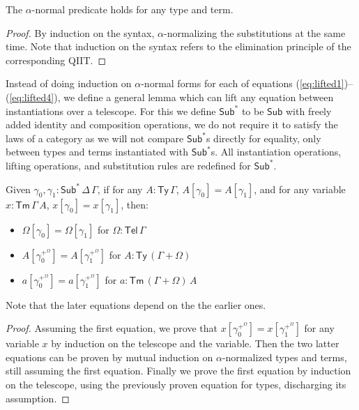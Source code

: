 \documentclass[a4paper,UKenglish,cleveref, autoref, thm-restate]{lipics-v2021}
\newcommand{\Ty}{\mathsf{Ty}}
\newcommand{\Tm}{\mathsf{Tm}}
\newcommand{\Sub}{\mathsf{Sub}}
\newcommand{\Tel}{\mathsf{Tel}}
\begin{document}
\begin{lemma}
  \label{thm:alpha}
  The $\alpha$-normal predicate holds for any type and term.
\end{lemma}
\begin{proof}
  By induction on the syntax, $\alpha$-normalizing the substitutions
  at the same time. Note that induction on the syntax refers to the
  elimination principle of the corresponding QIIT.
\end{proof}

Instead of doing induction on $\alpha$-normal forms for each of equations 
(\ref{eq:lifted1})--(\ref{eq:lifted4}), we define a general lemma which can lift any equation between
instantiations over a telescope. For this we define $\Sub^*$ to be $\Sub$ with
freely added identity and composition operations, we do not require it to
satisfy the laws of a category as we will not compare $\Sub^*$s directly for
equality, only between types and terms instantiated with $\Sub^*$s. All
instantiation operations, lifting operations, and substitution rules are
redefined for $\Sub^*$.
\begin{lemma}
  \label{thm:lifting}
  Given $\gamma_0, \gamma_1 : \Sub^*\,\Delta\,\Gamma$, if for any $A:\Ty\,\Gamma$, $A[\gamma_0] = A[\gamma_1]$, and
  for any variable $x:\Tm\,\Gamma\,A$, $x[\gamma_0] = x[\gamma_1]$,
  then:
  \begin{itemize}
    \item $\Omega[\gamma_0] = \Omega[\gamma_1]$ for $\Omega:\Tel\,\Gamma$
    \item $A[\gamma_0^{+^\Omega}] = A[\gamma_1^{+^\Omega}]$ for $A:\Ty\,(\Gamma+\Omega)$
    \item $a[\gamma_0^{+^\Omega}] = a[\gamma_1^{+^\Omega}]$ for $a:\Tm\,(\Gamma+\Omega)\,A$
  \end{itemize}
  Note that the later equations depend on the the earlier ones.
\end{lemma}
\begin{proof}
  Assuming the first equation, we prove that $x[\gamma_0^{+^\Omega}] =
  x[\gamma_1^{+^\Omega}]$ for any variable $x$ by induction on the telescope and
  the variable. Then the two latter equations can be proven by mutual induction
  on $\alpha$-normalized types and terms, still assuming the first equation.
  Finally we prove the first equation by induction on the telescope, using the
  previously proven equation for types, discharging its assumption.
\end{proof}
\end{document}
